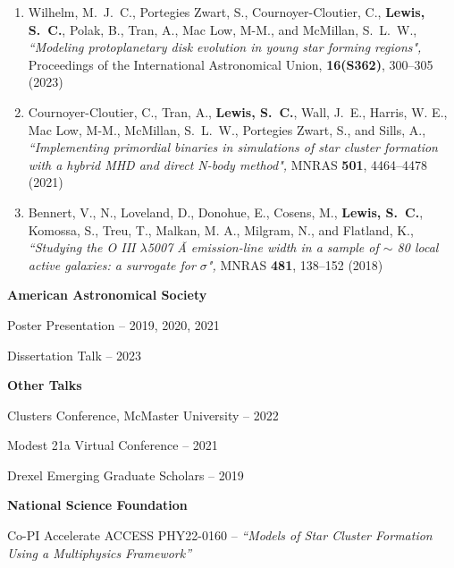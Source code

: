 \documentclass[twoside]{drexel-thesis}
\begin{document}
\begin{vita}
\begin{enumerate}
    \item {Wilhelm}, M.~J.~C., {Portegies Zwart}, S., {Cournoyer-Cloutier}, C., \textbf{{Lewis}, S.~C.}, {Polak}, B., {Tran}, A., {Mac Low}, M-M., and {McMillan}, S.~L.~W., \textit{``Modeling protoplanetary disk evolution in young star forming regions",} Proceedings of the International Astronomical Union, \textbf{16(S362)}, 300--305 (2023)
 
    \item {Cournoyer-Cloutier}, C., {Tran}, A., \textbf{{Lewis}, S.~C.}, {Wall}, J.~E., {Harris}, W. E., {Mac Low}, M-M., {McMillan}, S.~L.~W., {Portegies Zwart}, S., and {Sills}, A., \textit{``Implementing primordial binaries in simulations of star cluster formation with a hybrid MHD and direct N-body method",} MNRAS \textbf{501}, 4464--4478 (2021) %
  
    \item {Bennert}, V., N., {Loveland}, D., {Donohue}, E., {Cosens}, M., \textbf{{Lewis}, S.~C.}, {Komossa}, S., {Treu}, T., {Malkan}, M. A., {Milgram}, N., and {Flatland}, K., \textit{``Studying the O III $\lambda$5007 Ã emission-line width in a sample of $\sim$ 80 local active galaxies: a surrogate for $\sigma$",} MNRAS \textbf{481}, 138--152 (2018) %
\end{enumerate}


\textbf{American Astronomical Society}

\quad Poster Presentation -- 2019, 2020, 2021

\quad Dissertation Talk -- 2023

\textbf{Other Talks}

\quad Clusters Conference, McMaster University -- 2022

\quad Modest 21a Virtual Conference -- 2021

\quad Drexel Emerging Graduate Scholars -- 2019


\textbf{National Science Foundation}

\quad Co-PI Accelerate ACCESS PHY22-0160 -- \emph{``Models of Star Cluster Formation Using a Multiphysics Framework''}


\end{vita}
\end{document}
